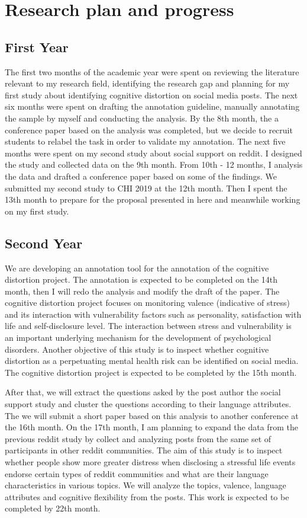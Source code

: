 \chapter{Research plan and progress}  
\section{First Year}
The first two months of the academic year were spent on reviewing the literature relevant to my research field, identifying the research gap and planning for my first study about identifying cognitive distortion on social media posts. The next six months were spent on drafting the annotation guideline, manually annotating the sample by myself and conducting the analysis. By the 8th month, the a conference paper based on the analysis was completed, but we decide to recruit students to relabel the task in order to validate my annotation. The next five months were spent on my second study about social support on reddit. I designed the study and collected data on the 9th month. From 10th - 12 months, I analysis the data and drafted a conference paper based on some of the findings. We submitted my second study to CHI 2019 at the 12th month. Then I spent the 13th month to prepare for the proposal presented in here and meanwhile working on my first study. 

\section{Second Year}
We are developing an annotation tool for the annotation of the cognitive distortion project. The annotation is expected to be completed on the 14th month, then I will redo the analysis and modify the draft of the paper. The cognitive distortion project focuses on monitoring valence (indicative of stress) and its interaction with vulnerability factors such as personality, satisfaction with life and self-disclosure level. The interaction between stress and vulnerability is an important underlying mechanism for the development of psychological disorders. Another objective of this study is to inspect whether cognitive distortion as a perpetuating mental health risk can be identified on social media. The cognitive distortion project is expected to be completed by the 15th month.

After that, we will extract the questions asked by the post author the social support study and cluster the questions according to their language attributes. The we will submit a short paper based on this analysis to another conference at the 16th month. On the 17th month, I am planning to expand the data from the previous reddit study by collect and analyzing posts from the same set of participants in other reddit communities. The aim of this study is to inspect whether people show more greater distress when disclosing a stressful life events endorse certain types of reddit communities and what are their language characteristics in various topics. We will analyze the topics, valence, language attributes and cognitive flexibility from the posts. This work is expected to be completed by 22th month. 

